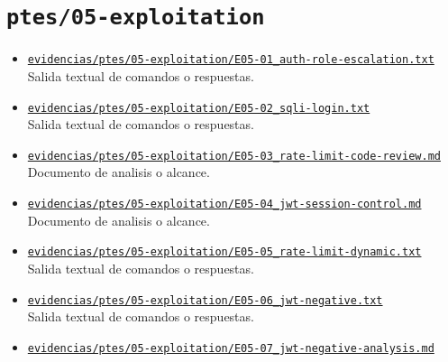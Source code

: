 \section{\texorpdfstring{\nolinkurl{ptes/05-exploitation}}{ptes/05-exploitation}}
\begin{itemize}[leftmargin=1.2em]
  \item \href{https://github.com/gamurigm/inventrack-ptes-report/blob/main/evidencias/ptes/05-exploitation/E05-01_auth-role-escalation.txt}{\nolinkurl{evidencias/ptes/05-exploitation/E05-01_auth-role-escalation.txt}}\\
  {\small Salida textual de comandos o respuestas.}
  \item \href{https://github.com/gamurigm/inventrack-ptes-report/blob/main/evidencias/ptes/05-exploitation/E05-02_sqli-login.txt}{\nolinkurl{evidencias/ptes/05-exploitation/E05-02_sqli-login.txt}}\\
  {\small Salida textual de comandos o respuestas.}
  \item \href{https://github.com/gamurigm/inventrack-ptes-report/blob/main/evidencias/ptes/05-exploitation/E05-03_rate-limit-code-review.md}{\nolinkurl{evidencias/ptes/05-exploitation/E05-03_rate-limit-code-review.md}}\\
  {\small Documento de analisis o alcance.}
  \item \href{https://github.com/gamurigm/inventrack-ptes-report/blob/main/evidencias/ptes/05-exploitation/E05-04_jwt-session-control.md}{\nolinkurl{evidencias/ptes/05-exploitation/E05-04_jwt-session-control.md}}\\
  {\small Documento de analisis o alcance.}
  \item \href{https://github.com/gamurigm/inventrack-ptes-report/blob/main/evidencias/ptes/05-exploitation/E05-05_rate-limit-dynamic.txt}{\nolinkurl{evidencias/ptes/05-exploitation/E05-05_rate-limit-dynamic.txt}}\\
  {\small Salida textual de comandos o respuestas.}
  \item \href{https://github.com/gamurigm/inventrack-ptes-report/blob/main/evidencias/ptes/05-exploitation/E05-06_jwt-negative.txt}{\nolinkurl{evidencias/ptes/05-exploitation/E05-06_jwt-negative.txt}}\\
  {\small Salida textual de comandos o respuestas.}
  \item \href{https://github.com/gamurigm/inventrack-ptes-report/blob/main/evidencias/ptes/05-exploitation/E05-07_jwt-negative-analysis.md}{\nolinkurl{evidencias/ptes/05-exploitation/E05-07_jwt-negative-analysis.md}}\\

\end{itemize}
